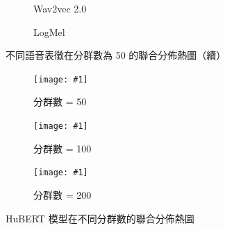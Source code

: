 {\begin{figure}
          \begin{subfigure}{\textwidth}  %
         \centering
         \caption{Wav2vec 2.0}
         \label{fig:ch3-heatmap-model--w2v2-50-joint-byprob}
     \end{subfigure}
     
     \vfill
     \begin{subfigure}{\textwidth}  %
         \centering
         \caption{LogMel}
         \label{fig:ch3-heatmap-model--logmel-50-joint-byprob}
     \end{subfigure}
     \caption{不同語音表徵在分群數為 50 的聯合分佈熱圖（續）}
     \label{fig:ch3-heatmap-model-comparison--part2}
\end{figure}

}  %

{

\newcommand{\jeffheightt}[1]{\texttt{[image: \#1]}}

\begin{figure}
     \centering
     \begin{subfigure}{\textwidth}  %
         \centering
         \jeffheightt{figures/hubert-50-joint-byprob--new2.png}
         \caption{分群數 = 50}
         \label{fig:ch3-heatmap-cluster--hubert-50-joint-byprob}
     \end{subfigure}
     \vfill

     \begin{subfigure}{\textwidth}  %
         \centering
         \jeffheightt{figures/hubert-100-joint-byprob---new2.png}
         \caption{分群數 = 100}
         \label{fig:ch3-heatmap-cluster--hubert-100-joint-byprob}
     \end{subfigure}

    \vfill

     \begin{subfigure}{\textwidth}  %
         \centering
         \jeffheightt{figures/hubert-200-joint-byprob.png}
         \caption{分群數 = 200}
         \label{fig:ch3-heatmap-cluster--hubert-200-joint-byprob}
     \end{subfigure}

     \caption{HuBERT 模型在不同分群數的聯合分佈熱圖}
     \label{fig:hubert-comparison}
\end{figure}

}

